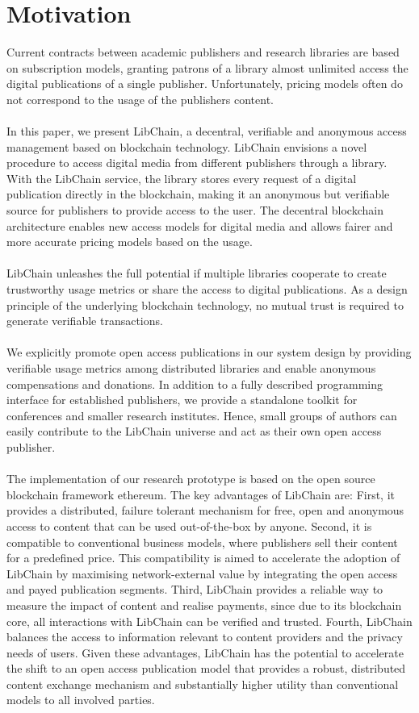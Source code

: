 \chapter{Motivation\label{cha:motivation}}
Current contracts between academic publishers and research libraries are based on subscription models, granting patrons of a library almost unlimited access the digital publications of a single publisher. Unfortunately, pricing models often do not correspond to the usage of the publishers content. 
\\
\\
In this paper, we present LibChain, a decentral, verifiable and anonymous access management based on blockchain technology. LibChain envisions a novel procedure to access digital media from different publishers through a library.  With the LibChain service, the library stores every request of a digital publication directly in the blockchain, making it an anonymous but verifiable source for publishers to provide access to the user. The decentral blockchain architecture enables new access models for digital media and allows fairer and more accurate pricing models based on the usage.
\\
\\
LibChain unleashes the full potential if multiple libraries cooperate to create trustworthy usage metrics or share the access to digital publications. As a design principle of the underlying blockchain technology, no mutual trust is required to generate verifiable transactions. 
\\
\\
We explicitly promote open access publications in our system design by providing verifiable usage metrics among distributed libraries and enable anonymous compensations and donations. In addition to a fully described programming interface for established publishers, we provide a standalone toolkit for conferences and smaller research institutes. Hence, small groups of authors can easily contribute to the LibChain universe and act as their own open access publisher.
\\
\\
The implementation of our research prototype is based on the open source blockchain framework ethereum. The key advantages of LibChain are: First, it provides a distributed, failure tolerant mechanism for free, open and anonymous access to content that can be used out-of-the-box by anyone. Second, it is compatible to conventional business models, where publishers sell their content for a predefined price. This compatibility is aimed to accelerate the adoption of LibChain by maximising network-external value by integrating the open access and payed publication segments. Third, LibChain provides a reliable way to measure the impact of content and realise payments, since due to its blockchain core, all interactions with LibChain can be verified and trusted. Fourth, LibChain balances the access to information relevant to content providers and the privacy needs of users. Given these advantages, LibChain has the potential to accelerate the shift to an open access publication model that provides a robust, distributed content exchange mechanism and substantially higher utility than conventional models to all involved parties.

